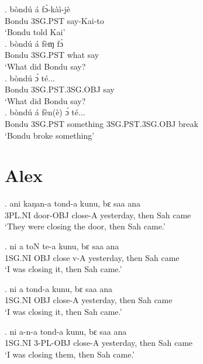 \documentclass{assets/fieldnotes}
\begin{document}
\exg. bòndú á fɔ̀-kàì-jè\\
Bondu 3SG.PST say-Kai-to\\
`Bondu told Kai'\\

\exg. bòndú á fèɱ fɔ̀\\
Bondu 3SG.PST what say\\
`What did Bondu say?\\

\exg. bòndú ɔ́ té...\\
Bondu 3SG.PST.3SG.OBJ say\\
`What did Bondu say? \\

\exg. bòndú á fèn(è) ɔ́ té...\\
Bondu 3SG.PST something 3SG.PST.3SG.OBJ break\\
`Bondu broke something' \\



\section{Alex}

\exg.
ani      kaŋan-a    tond-a    kunu,        bɛ     saa   ana  \\
3PL.NI   door-OBJ   close-A   yesterday,   then   Sah   came \\%
`They were closing the door, then Sah came.'

\exg.
ni       a         toN     te-a   kunu,        bɛ     saa   ana  \\
1SG.NI   OBJ   close   v-A    yesterday,   then   Sah   came \\%
`I was closing it, then Sah came.' \label{62301}

\exg.
ni       a         tond-a    kunu,        bɛ     saa   ana  \\
1SG.NI   OBJ   close-A   yesterday,   then   Sah   came \\%
`I was closing it, then Sah came.' \label{32115}


\exg.
ni       a-n-a      tond-a    kunu,        bɛ     saa   ana  \\
1SG.NI   3-PL-OBJ   close-A   yesterday,   then   Sah   came \\%
`I was closing them, then Sah came.'
\end{document}

